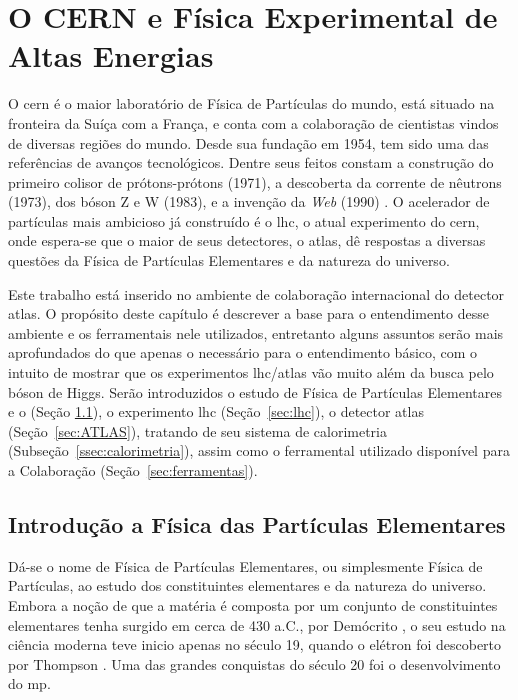 \chapter{O CERN e Física Experimental de Altas Energias}
\label{cap:cern}
\glsresetall


O \gls{cern} é o maior laboratório de Física de Partículas do mundo, 
está situado na fronteira da Suíça com
a França, e conta com a colaboração de cientistas vindos 
de diversas regiões do mundo. Desde sua fundação em 1954, tem sido uma das referências de
avanços tecnológicos. Dentre seus feitos constam a construção do primeiro 
colisor de prótons-prótons (1971), a descoberta 
da corrente de nêutrons (1973), dos bóson Z e W (1983), 
e a invenção da \emph{Web} (1990) \cite{webCERN}. O acelerador de partículas mais ambicioso 
\cite{Intro_Standard,Beiser} já construído é o \gls{lhc}, o atual experimento do
\gls{cern}, onde espera-se que o maior de seus 
detectores, o \gls{atlas}, dê respostas a diversas questões da Física de Partículas
Elementares e da natureza do universo.

Este trabalho está inserido no ambiente de colaboração internacional do detector
\gls{atlas}. O propósito deste capítulo é descrever a base para o entendimento desse ambiente
e os ferramentais nele utilizados, entretanto alguns assuntos serão mais
aprofundados do que apenas o necessário para o entendimento básico, com o
intuito de mostrar que os experimentos \gls{lhc}/\gls{atlas} vão muito além 
da busca pelo bóson de Higgs. Serão introduzidos o estudo de Física de Partículas
Elementares e o  (Seção \ref{sec:fis_part}), 
o experimento \gls{lhc} (Seção~\ref{sec:lhc}), o detector
\gls{atlas} (Seção~\ref{sec:ATLAS}), tratando de seu sistema de calorimetria
(Subseção~\ref{ssec:calorimetria}), assim como o ferramental utilizado
disponível para a Colaboração (Seção~\ref{sec:ferramentas}). 

\section{Introdução a Física das Partículas Elementares}
\label{sec:fis_part}

Dá-se o nome de Física de Partículas Elementares, ou simplesmente Física de
Partículas, ao estudo dos constituintes
elementares e da natureza do universo. Embora a noção de que a matéria é
composta por um conjunto de constituintes elementares tenha surgido em cerca de
430 a.C., por Demócrito \cite{democritos}, o seu estudo na ciência moderna teve inicio apenas 
no século 19, quando o elétron foi descoberto por Thompson \cite{thompson}.
Uma das grandes conquistas do século 20 foi o desenvolvimento do \gls{mp}.  


